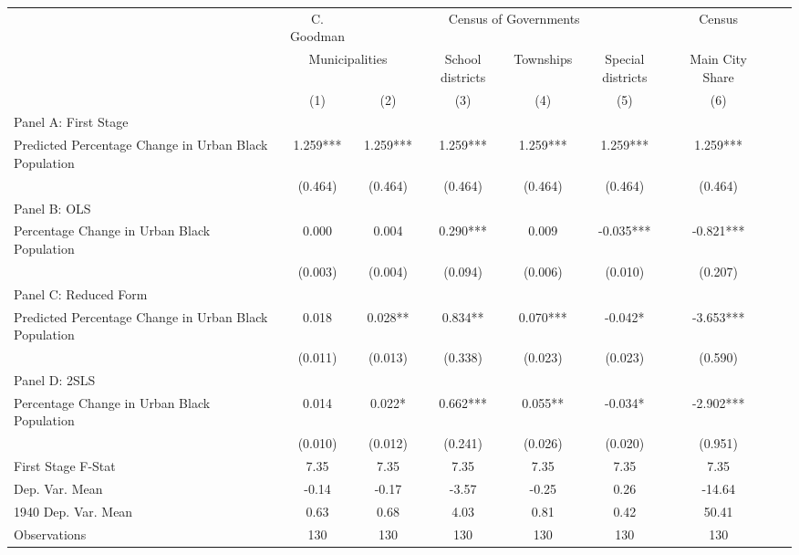  \begin{tabular}{l*{8}{c}} \toprule
&\multicolumn{1}{c}{C. Goodman}&\multicolumn{4}{c}{Census of Governments}&\multicolumn{1}{c}{Census}\\\cmidrule(lr){2-2}\cmidrule(lr){3-6}\cmidrule(lr){7-7}
&\multicolumn{2}{c}{Municipalities}&\multicolumn{1}{c}{School districts}&\multicolumn{1}{c}{Townships}&\multicolumn{1}{c}{Special districts}&\multicolumn{1}{c}{Main City Share}\\\cmidrule(lr){2-3}\cmidrule(lr){4-6}\cmidrule(lr){7-7}
&\multicolumn{1}{c}{(1)}&\multicolumn{1}{c}{(2)}&\multicolumn{1}{c}{(3)}&\multicolumn{1}{c}{(4)}&\multicolumn{1}{c}{(5)}&\multicolumn{1}{c}{(6)}\\
\cmidrule(lr){1-7}
\multicolumn{6}{l}{Panel A: First Stage}\\
\cmidrule(lr){1-7}
Predicted Percentage Change in Urban Black Population&    1.259***&    1.259***&    1.259***&    1.259***&    1.259***&    1.259***\\
                &  (0.464)   &  (0.464)   &  (0.464)   &  (0.464)   &  (0.464)   &  (0.464)   \\
\cmidrule(lr){1-7}
\multicolumn{6}{l}{Panel B: OLS}\\
\cmidrule(lr){1-7}
Percentage Change in Urban Black Population&    0.000   &    0.004   &    0.290***&    0.009   &   -0.035***&   -0.821***\\
                &  (0.003)   &  (0.004)   &  (0.094)   &  (0.006)   &  (0.010)   &  (0.207)   \\
\cmidrule(lr){1-7}
\multicolumn{6}{l}{Panel C: Reduced Form}\\
\cmidrule(lr){1-7}
Predicted Percentage Change in Urban Black Population&    0.018   &    0.028** &    0.834** &    0.070***&   -0.042*  &   -3.653***\\
                &  (0.011)   &  (0.013)   &  (0.338)   &  (0.023)   &  (0.023)   &  (0.590)   \\
\cmidrule(lr){1-7}
\multicolumn{6}{l}{Panel D: 2SLS}\\
\cmidrule(lr){1-7}
Percentage Change in Urban Black Population&    0.014   &    0.022*  &    0.662***&    0.055** &   -0.034*  &   -2.902***\\
                &  (0.010)   &  (0.012)   &  (0.241)   &  (0.026)   &  (0.020)   &  (0.951)   \\
\midrule
First Stage F-Stat&     7.35   &     7.35   &     7.35   &     7.35   &     7.35   &     7.35   \\
Dep. Var. Mean  &    -0.14   &    -0.17   &    -3.57   &    -0.25   &     0.26   &   -14.64   \\
1940 Dep. Var. Mean&     0.63   &     0.68   &     4.03   &     0.81   &     0.42   &    50.41   \\
Observations    &      130   &      130   &      130   &      130   &      130   &      130   \\
 \bottomrule \end{tabular}
